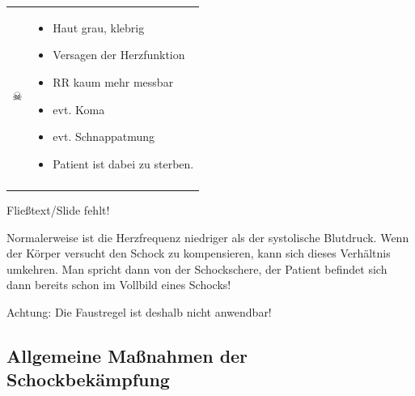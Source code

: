 \begin{table}[H]
\begin{tabular}{p{3.5cm}p{8cm}}
\huge\centering $\skull$
&
\begin{itemize}
  \item Haut grau, klebrig
  \item Versagen der Herzfunktion
  \item RR kaum mehr messbar
  \item evt. Koma
  \item evt. Schnappatmung
  \item Patient ist dabei zu sterben.
\end{itemize}
\\\addlinespace\bottomrule
\end{tabular}
\end{table}


{
   {Fließtext/Slide fehlt!}



Normalerweise ist die Herzfrequenz niedriger als der systolische
Blutdruck. Wenn der Körper versucht den Schock zu
kompensieren, kann sich dieses Verhältnis umkehren. Man spricht dann von der
Schockschere, der Patient befindet sich dann bereits schon im Vollbild
eines Schocks! 

Achtung:  Die Faustregel ist deshalb nicht anwendbar!


}{}{}{}{}


\subsection{Allgemeine Maßnahmen der Schockbekämpfung}
\label{topic:schockbekaempfung}


